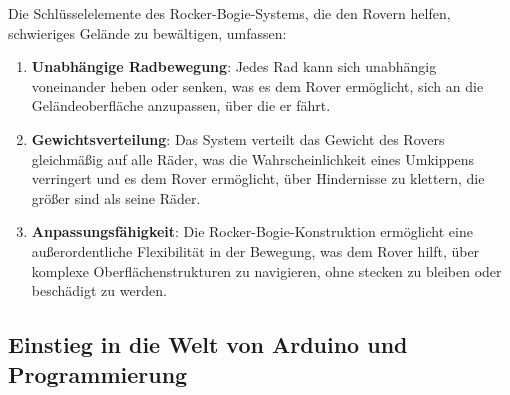 \documentclass{vorlage-design-main}
\begin{document}
Die Schlüsselelemente des Rocker-Bogie-Systems, die den Rovern helfen,
schwieriges Gelände zu bewältigen, umfassen:

\begin{enumerate}
\def\labelenumi{\arabic{enumi}.}

\item
  \textbf{Unabhängige Radbewegung}: Jedes Rad kann sich unabhängig
  voneinander heben oder senken, was es dem Rover ermöglicht, sich an
  die Geländeoberfläche anzupassen, über die er fährt.
\item
  \textbf{Gewichtsverteilung}: Das System verteilt das Gewicht des
  Rovers gleichmäßig auf alle Räder, was die Wahrscheinlichkeit eines
  Umkippens verringert und es dem Rover ermöglicht, über Hindernisse zu
  klettern, die größer sind als seine Räder.
\item
  \textbf{Anpassungsfähigkeit}: Die Rocker-Bogie-Konstruktion ermöglicht
  eine außerordentliche Flexibilität in der Bewegung, was dem Rover
  hilft, über komplexe Oberflächenstrukturen zu navigieren, ohne stecken
  zu bleiben oder beschädigt zu werden.
\end{enumerate}

\hypertarget{einstieg-in-die-welt-von-arduino-und-programmierung}{%
\subsection{Einstieg in die Welt von Arduino und
Programmierung}\label{einstieg-in-die-welt-von-arduino-und-programmierung}}
\end{document}
